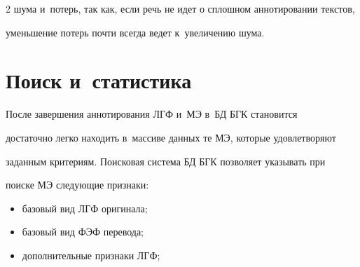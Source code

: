 \begin{multicols}{2}
шума и~потерь, так как, если речь не идет о сплошном аннотировании текстов, 

уменьшение потерь почти всегда ведет к~увеличению шума.



\section{Поиск и~статистика}



  После завершения аннотирования ЛГФ и~МЭ в~БД БГК становится 

достаточно легко находить в~массиве данных те МЭ, которые удовлетворяют 

заданным критериям. Поисковая система БД БГК позволяет указывать при 

поиске МЭ следующие признаки:

  \begin{itemize}

\item базовый вид ЛГФ оригинала;

\item базовый вид ФЭФ перевода;

\item дополнительные признаки ЛГФ;

\end{itemize}



\pagebreak



\end{multicols}



